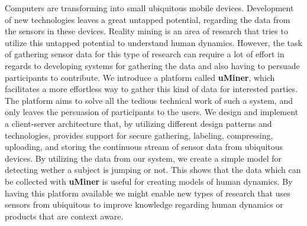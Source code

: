 
Computers are transforming into small ubiquitous mobile devices. Development of new technologies leaves a great untapped potential, regarding the data from the sensors in these devices. 
Reality mining is an area of research that tries to utilize this untapped potential to understand human dynamics. However, the task of gathering sensor data for this type of research can require a lot of effort in regards to developing systems for gathering the data and also having to persuade participants to contribute.
We introduce a platform called \textbf{uMiner}, which facilitates a more effortless way to gather this kind of data for interested parties. The platform aims to solve all the tedious technical work of such a system, and only leaves the persuasion of participants to the users.
We design and implement a client-server architecture that, by utilizing different design patterns and technologies, provides support for secure gathering, labeling, compressing, uploading, and storing the continuous stream of sensor data from ubiquitous devices. 
By utilizing the data from our system, we create a simple model for detecting wether a subject is jumping or not. This shows that the data which can be collected with \textbf{uMiner} is useful for creating models of human dynamics.  
By having this platform available we might enable new types of research that uses sensors from ubiquitous to improve knowledge regarding human dynamics or products that are context aware.